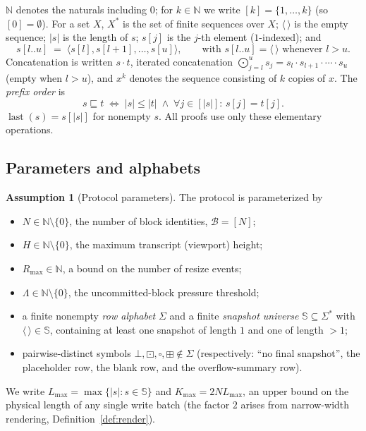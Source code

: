 \documentclass[11pt]{article}
\newcommand{\seq}[1]{\langle #1\rangle}
\newcommand{\emptyseq}{\seq{\,}}
\newcommand{\len}[1]{\lvert #1\rvert}
\newcommand{\pre}{\sqsubseteq}                 %
\newcommand{\cat}{\mathbin{\cdot}}             %
\newcommand{\Cat}{\bigodot}                    %
\newcommand{\Blocks}{\mathcal{B}}
\newcommand{\Snap}{\mathbb{S}}
\newcommand{\NoFinal}{\bot}
\newcommand{\PhRow}{\boxdot}                   %
\newcommand{\BlRow}{\square}                   %
\newcommand{\OvRow}{\boxplus}                  %
\newcommand{\MaxLive}{\Lambda}
\newcommand{\MaxRes}{R_{\max}}
\newcommand{\Lmax}{L_{\max}}
\newcommand{\Fmax}{K_{\max}}
\DeclareMathOperator{\last}{last}
\theoremstyle{definition}
\newtheorem{assumption}[theorem]{Assumption}
\theoremstyle{remark}
\begin{document}
$\mathbb{N}$ denotes the naturals including $0$; for $k\in\mathbb{N}$ we write
$[k]=\{1,\dots,k\}$ (so $[0]=\emptyset$). For a set $X$, $X^{*}$ is the set of
finite sequences over $X$; $\emptyseq$ is the empty sequence; $\len{s}$ is the
length of $s$; $s[j]$ is the $j$-th element ($1$-indexed); and
\[
  s[l..u] \;=\; \seq{s[l],s[l{+}1],\dots,s[u]},
  \qquad\text{with } s[l..u]=\emptyseq \text{ whenever } l>u .
\]
Concatenation is written $s\cat t$, iterated concatenation
$\Cat_{j=l}^{u} s_j = s_l \cat s_{l+1}\cat\cdots\cat s_u$ (empty when $l>u$),
and $x^{k}$ denotes the sequence consisting of $k$ copies of $x$. The
\emph{prefix order} is
\[
  s \pre t \;\iff\; \len{s}\le\len{t} \;\wedge\; \forall j\in[\len{s}]:\,
  s[j]=t[j].
\]
$\last(s)=s[\len{s}]$ for nonempty $s$. All proofs use only these elementary
operations.

\subsection{Parameters and alphabets}

\begin{assumption}[Protocol parameters]\label{ass:params}
The protocol is parameterized by
\begin{itemize}
\item $N\in\mathbb{N}\setminus\{0\}$, the number of block identities,
  $\Blocks=[N]$;
\item $H\in\mathbb{N}\setminus\{0\}$, the maximum transcript (viewport)
  height;
\item $\MaxRes\in\mathbb{N}$, a bound on the number of resize events;
\item $\MaxLive\in\mathbb{N}\setminus\{0\}$, the uncommitted-block pressure
  threshold;
\item a finite nonempty \emph{row alphabet} $\Sigma$ and a finite
  \emph{snapshot universe} $\Snap\subseteq\Sigma^{*}$ with
  $\emptyseq\in\Snap$, containing at least one snapshot of length $1$ and one
  of length $>1$;
\item pairwise-distinct symbols
  $\NoFinal,\PhRow,\BlRow,\OvRow\notin\Sigma$ (respectively: ``no final
  snapshot'', the placeholder row, the blank row, and the overflow-summary
  row).
\end{itemize}
We write $\Lmax=\max\{\len{s}:s\in\Snap\}$ and
$\Fmax = 2N\Lmax$, an upper bound on the physical length of any single write
batch (the factor $2$ arises from narrow-width rendering,
Definition~\ref{def:render}).
\end{assumption}
\end{document}
